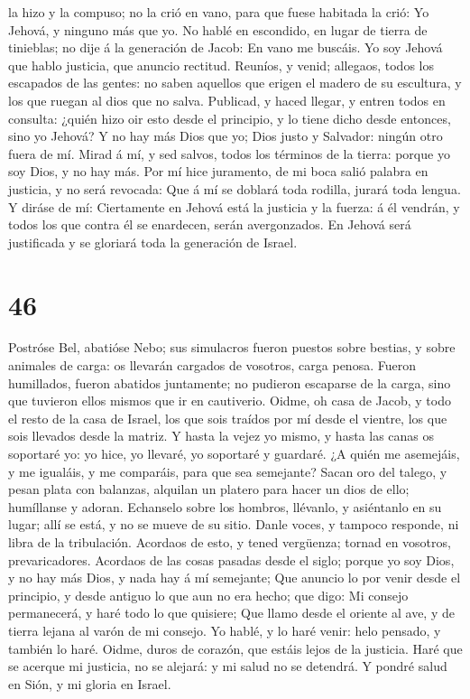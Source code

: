 la hizo y la compuso; no la crió en vano, para que fuese habitada la
crió: Yo Jehová, y ninguno más que yo.  No hablé en
escondido, en lugar de tierra de tinieblas; no dije á la generación de
Jacob: En vano me buscáis. Yo soy Jehová que hablo justicia, que anuncio
rectitud.  Reuníos, y venid; allegaos, todos los
escapados de las gentes: no saben aquellos que erigen el madero de su
escultura, y los que ruegan al dios que no salva. 
Publicad, y haced llegar, y entren todos en consulta: ¿quién hizo oir
esto desde el principio, y lo tiene dicho desde entonces, sino yo
Jehová? Y no hay más Dios que yo; Dios justo y Salvador: ningún otro
fuera de mí.  Mirad á mí, y sed salvos, todos los
términos de la tierra: porque yo soy Dios, y no hay más. 
Por mí hice juramento, de mi boca salió palabra en justicia, y no será
revocada: Que á mí se doblará toda rodilla, jurará toda lengua.
 Y diráse de mí: Ciertamente en Jehová está la justicia y
la fuerza: á él vendrán, y todos los que contra él se enardecen, serán
avergonzados.  En Jehová será justificada y se gloriará
toda la generación de Israel.

\hypertarget{section-45}{%
\section{46}\label{section-45}}

 Postróse Bel, abatióse Nebo; sus simulacros fueron
puestos sobre bestias, y sobre animales de carga: os llevarán cargados
de vosotros, carga penosa.  Fueron humillados, fueron
abatidos juntamente; no pudieron escaparse de la carga, sino que
tuvieron ellos mismos que ir en cautiverio.  Oidme, oh
casa de Jacob, y todo el resto de la casa de Israel, los que sois
traídos por mí desde el vientre, los que sois llevados desde la matriz.
 Y hasta la vejez yo mismo, y hasta las canas os soportaré
yo: yo hice, yo llevaré, yo soportaré y guardaré.  ¿A
quién me asemejáis, y me igualáis, y me comparáis, para que sea
semejante?  Sacan oro del talego, y pesan plata con
balanzas, alquilan un platero para hacer un dios de ello; humíllanse y
adoran.  Echanselo sobre los hombros, llévanlo, y
asiéntanlo en su lugar; allí se está, y no se mueve de su sitio. Danle
voces, y tampoco responde, ni libra de la tribulación. 
Acordaos de esto, y tened vergüenza; tornad en vosotros, prevaricadores.
 Acordaos de las cosas pasadas desde el siglo; porque yo
soy Dios, y no hay más Dios, y nada hay á mí semejante; 
Que anuncio lo por venir desde el principio, y desde antiguo lo que aun
no era hecho; que digo: Mi consejo permanecerá, y haré todo lo que
quisiere;  Que llamo desde el oriente al ave, y de tierra
lejana al varón de mi consejo. Yo hablé, y lo haré venir: helo pensado,
y también lo haré.  Oidme, duros de corazón, que estáis
lejos de la justicia.  Haré que se acerque mi justicia,
no se alejará: y mi salud no se detendrá. Y pondré salud en Sión, y mi
gloria en Israel.

